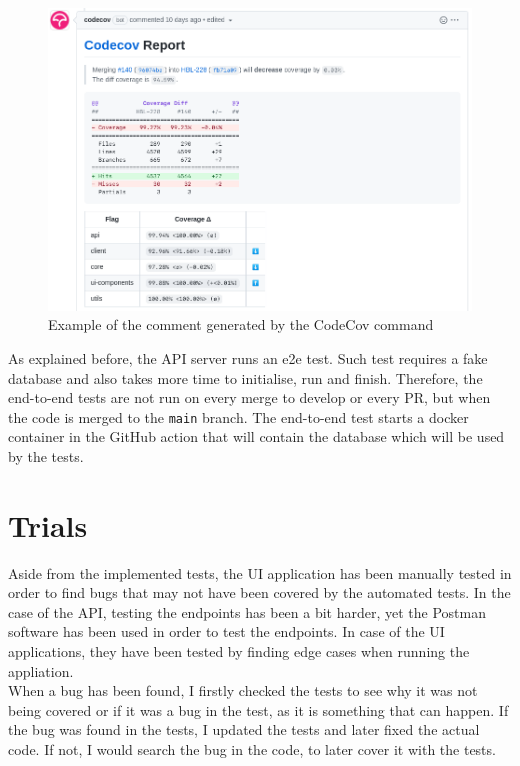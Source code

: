 \documentclass[a4paper, 12pt, oneside]{book}
\begin{document}
\begin{figure}[H]
	\centering
	\includegraphics[width=\textwidth]{assets/codecov-example.png}
	\caption{Example of the comment generated by the CodeCov command}
\end{figure}
As explained before, the API server runs an e2e test. Such test requires a fake database and also takes more time to initialise, run and finish. Therefore, the end-to-end tests are not run on every merge to develop or every PR, but when the code is merged to the \texttt{main} branch. The end-to-end test starts a docker container in the GitHub action that will contain the database which will be used by the tests.
\section{Trials}
Aside from the implemented tests, the UI application has been manually tested in order to find bugs that may not have been covered by the automated tests. In the case of the API, testing the endpoints has been a bit harder, yet the Postman software has been used in order to test the endpoints. In case of the UI applications, they have been tested by finding edge cases when running the appliation.
\\[8pt]
When a bug has been found, I firstly checked the tests to see why it was not being covered or if it was a bug in the test, as it is something that can happen. If the bug was found in the tests, I updated the tests and later fixed the actual code. If not, I would search the bug in the code, to later cover it with the tests.
\end{document}
